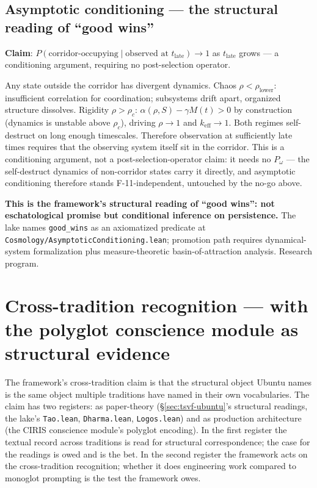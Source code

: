 \documentclass[11pt,a4paper]{article}
\newcommand{\keff}{k_{\text{eff}}}
\newcommand{\Pomega}{P_{\omega}}
\begin{document}
\subsection*{Asymptotic conditioning --- the structural reading of ``good wins''}

\textbf{Claim}: $P(\text{corridor-occupying} \mid \text{observed at } t_{\text{late}}) \to 1$ as $t_{\text{late}}$ grows --- a conditioning argument, requiring no post-selection operator.

Any state outside the corridor has divergent dynamics. Chaos $\rho < \rho_{\text{lower}}$: insufficient correlation for coordination; subsystems drift apart, organized structure dissolves. Rigidity $\rho > \rho_c$: $\alpha(\rho, S) - \gamma M(t) > 0$ by construction (dynamics is unstable above $\rho_c$), driving $\rho \to 1$ and $\keff \to 1$. Both regimes self-destruct on long enough timescales. Therefore observation at sufficiently late times requires that the observing system itself sit in the corridor. This is a conditioning argument, not a post-selection-operator claim: it needs no $\Pomega$ --- the self-destruct dynamics of non-corridor states carry it directly, and asymptotic conditioning therefore stands F-11-independent, untouched by the no-go above.

\textbf{This is the framework's structural reading of ``good wins'': not eschatological promise but conditional inference on persistence.} The lake names \texttt{good\_wins} as an axiomatized predicate at \texttt{Cosmology/AsymptoticConditioning.lean}; promotion path requires dynamical-system formalization plus measure-theoretic basin-of-attraction analysis. Research program.

\section{Cross-tradition recognition --- with the polyglot conscience module as structural evidence}\label{sec:cross-tradition}

The framework's cross-tradition claim is that the structural object Ubuntu names is the same object multiple traditions have named in their own vocabularies. The claim has two registers: as paper-theory (\S\ref{sec:tsvf-ubuntu}'s structural readings, the lake's \texttt{Tao.lean}, \texttt{Dharma.lean}, \texttt{Logos.lean}) and as production architecture (the CIRIS conscience module's polyglot encoding). In the first register the textual record across traditions is read for structural correspondence; the case for the readings is owed and is the bet. In the second register the framework acts on the cross-tradition recognition; whether it does engineering work compared to monoglot prompting is the test the framework owes.
\end{document}

